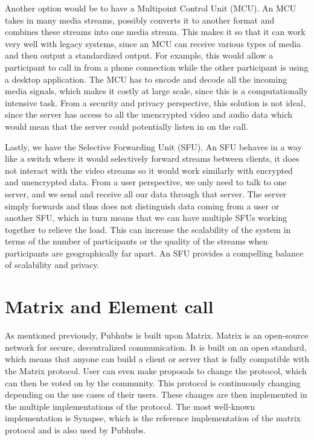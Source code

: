 \documentclass{report}
\begin{document}
Another option would be to have a Multipoint Control Unit (MCU). An MCU takes in many media streams, possibly
converts it to another format and combines these streams into one media stream. This makes it so that it can work
very well with legacy systems, since an MCU can receive various types of media and then output a standardized
output. For example, this would allow a participant to call in from a phone connection while the other participant
is using a desktop application. The MCU has to encode and decode all the incoming media signals, which makes it
costly at large scale, since this is a computationally intensive task. From a security and privacy perspective, this
solution is not ideal, since the server has access to all the unencrypted video and audio data which would mean that
the server could potentially listen in on the call.

Lastly, we have the Selective Forwarding Unit (SFU). An SFU behaves in a way like a switch where it would
selectively forward streams between clients, it does not interact with the video streams so it would work similarly
with encrypted and unencrypted data. From a user perspective, we only need to talk to one server, and we send and
receive all our data through that server. The server simply forwards and thus does not distinguish data coming from
a user or another SFU, which in turn means that we can have multiple SFUs working together to relieve the load. This
can increase the scalability of the system in terms of the number of participants or the quality of the streams when
participants are geographically far apart. An SFU provides a compelling balance of scalability and privacy.

\section{Matrix and Element call}
As mentioned previously, Pubhubs is built upon Matrix. Matrix is an open-source network for secure, decentralized
communication. It is built on an open standard, which means that anyone can build a client or server that is fully
compatible with the Matrix protocol. User can even make proposals to change the protocol, which can then be voted on
by the community. This protocol is continuously changing depending on the use cases of their users. These changes
are then implemented in the multiple implementations of the protocol. The most well-known implementation is Synapse,
which is the reference implementation of the matrix protocol and is also used by Pubhubs.
\end{document}

